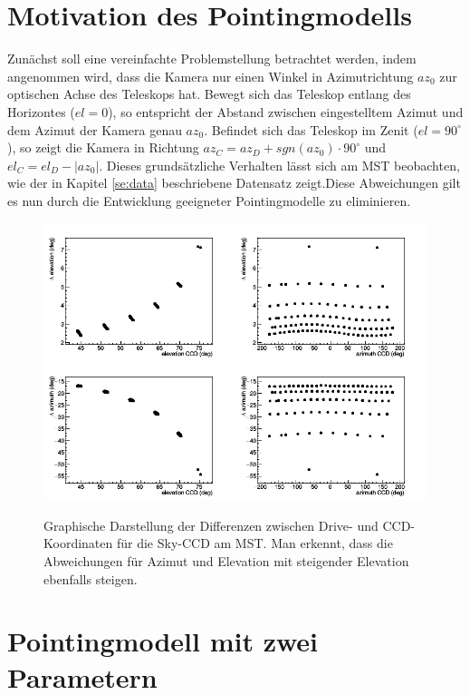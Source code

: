 \section{Motivation des Pointingmodells}
Zunächst soll eine vereinfachte Problemstellung betrachtet werden, indem angenommen wird, dass die Kamera nur einen Winkel in Azimutrichtung $az_0$ zur optischen Achse des Teleskops hat. Bewegt sich das Teleskop entlang des Horizontes ($el=0$), so entspricht der Abstand zwischen eingestelltem Azimut und dem Azimut der Kamera genau $az_0$. Befindet sich das Teleskop im Zenit ($el=90^{\circ}$), so zeigt die Kamera in Richtung $az_C=az_D+\unit{sgn}(az_0)\cdot90^{\circ}$ und $el_C=el_D-|az_0|$. Dieses grundsätzliche Verhalten lässt sich am MST beobachten, wie der in Kapitel \ref{se:data} beschriebene Datensatz zeigt.Diese Abweichungen gilt es nun durch die Entwicklung geeigneter Pointingmodelle zu eliminieren.\newpage
\begin{figure}[htbp]
\centering
\includegraphics[width=\textwidth]{../341/data2.png}
\label{img:dataset}
\caption{Graphische Darstellung der Differenzen zwischen Drive- und CCD-Koordinaten für die Sky-CCD am MST. Man erkennt, dass die Abweichungen für Azimut und Elevation mit steigender Elevation ebenfalls steigen.}
\end{figure}

\section{Pointingmodell mit zwei Parametern}
